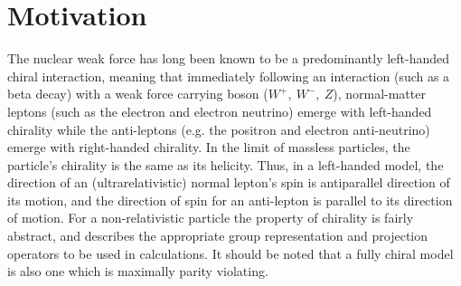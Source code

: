 

\section{Motivation}
\label{motivation}

The nuclear weak force has long been known to be a predominantly left-handed chiral interaction, meaning that immediately following an interaction (such as a beta decay) with a weak force carrying boson ($W^+,\: W^-,\: Z$), 
normal-matter leptons (such as the electron and electron neutrino) emerge with left-handed chirality
while the anti-leptons (e.g. the positron and electron anti-neutrino) emerge with right-handed chirality.  
In the limit of massless particles, the particle's chirality is the same as its helicity. Thus, in a left-handed model, the direction of an (ultrarelativistic) normal lepton's spin is antiparallel direction of its motion, and the direction of spin for an anti-lepton is parallel to its direction of motion.  For a non-relativistic particle the property of chirality is fairly abstract, and describes the appropriate group representation and projection operators to be used in calculations.  It should be noted that a fully chiral model is also one which is maximally parity violating.

